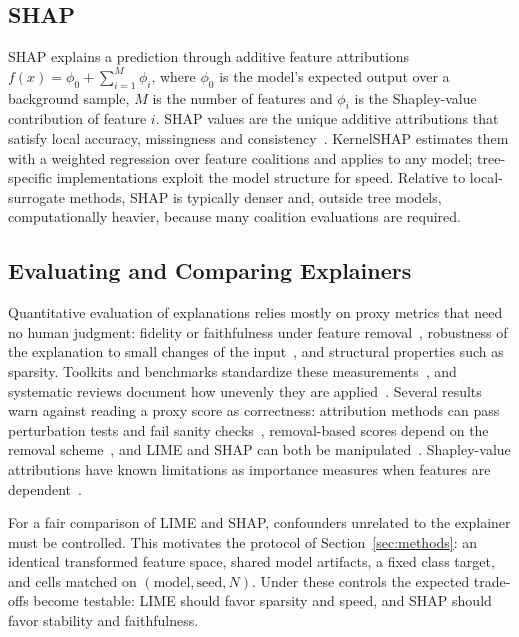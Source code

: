 \documentclass{cleiej}
\begin{document}
\subsection{SHAP}

SHAP explains a prediction through additive feature attributions
$f(x) = \phi_0 + \sum_{i=1}^{M} \phi_i$, where $\phi_0$ is the model's
expected output over a background sample, $M$ is the number of features and
$\phi_i$ is the Shapley-value contribution of feature $i$. SHAP values are
the unique additive attributions that satisfy local accuracy, missingness
and consistency~\cite{lundberg2017unified}. KernelSHAP estimates them with
a weighted regression over feature coalitions and applies to any model;
tree-specific implementations exploit the model structure for speed.
Relative to local-surrogate methods, SHAP is typically denser and, outside
tree models, computationally heavier, because many coalition evaluations
are required.

\subsection{Evaluating and Comparing Explainers}

Quantitative evaluation of explanations relies mostly on proxy metrics that
need no human judgment: fidelity or faithfulness under feature
removal~\cite{bhatt2020evaluating,samek2017evaluating,hooker2019benchmark},
robustness of the explanation to small changes of the
input~\cite{alvarezmelis2018robustness}, and structural properties such as
sparsity. Toolkits and benchmarks standardize these
measurements~\cite{hedstrom2023quantus,agarwal2022openxai}, and systematic
reviews document how unevenly they are
applied~\cite{nauta2023anecdotal,canha2025benchmark}. Several results warn
against reading a proxy score as correctness: attribution methods can pass
perturbation tests and fail sanity checks~\cite{adebayo2018sanity},
removal-based scores depend on the removal
scheme~\cite{rong2022consistent}, and LIME and SHAP can both be
manipulated~\cite{slack2020fooling}. Shapley-value attributions have known
limitations as importance measures when features are
dependent~\cite{kumar2020problems}.

For a fair comparison of LIME and SHAP, confounders unrelated to the
explainer must be controlled. This motivates the protocol of
Section~\ref{sec:methods}: an identical transformed feature space, shared
model artifacts, a fixed class target, and cells matched on
$(\mathrm{model}, \mathrm{seed}, N)$. Under these controls the expected
trade-offs become testable: LIME should favor sparsity and speed, and SHAP
should favor stability and faithfulness.
\end{document}
